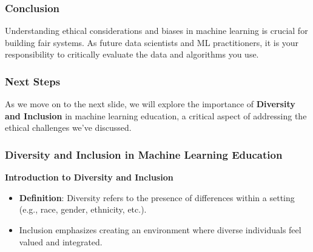 \documentclass[aspectratio=169]{beamer}
\begin{document}
\begin{frame}
    \frametitle{Conclusion}
    Understanding ethical considerations and biases in machine learning is crucial for building fair systems. 
    As future data scientists and ML practitioners, it is your responsibility to critically evaluate the data and algorithms you use.
\end{frame}

\begin{frame}
    \frametitle{Next Steps}
    As we move on to the next slide, we will explore the importance of \textbf{Diversity and Inclusion} in machine learning education, a critical aspect of addressing the ethical challenges we've discussed.
\end{frame}

\begin{frame}[fragile]
    \frametitle{Diversity and Inclusion in Machine Learning Education}
    \textbf{Introduction to Diversity and Inclusion} \\
    \pause
    \begin{itemize}
        \item \textbf{Definition}: Diversity refers to the presence of differences within a setting (e.g., race, gender, ethnicity, etc.).
        \item Inclusion emphasizes creating an environment where diverse individuals feel valued and integrated.
    \end{itemize}
\end{frame}
\end{document}
